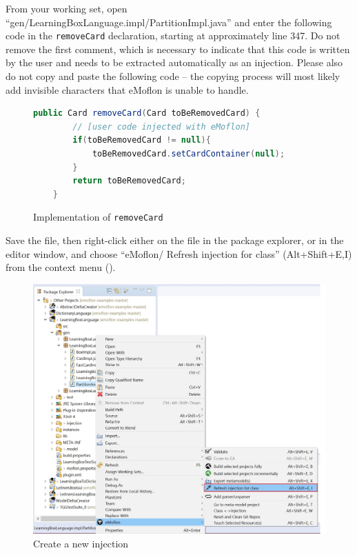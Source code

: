 \begin{stepbystep}

\item From your working set, open ``gen/LearningBoxLanguage.impl/Part\-it\-ionImpl.java'' and enter the following code in the
\texttt{removeCard} declaration, starting at approximately line 347. Do not remove the first comment, which is necessary to indicate that this code is written
by the user and needs to be extracted automatically as an injection. Please also do not copy and paste the following code -- the copying process will most
likely add invisible characters that eMoflon is unable to handle.

\vspace{0.5cm}

\begin{figure}[htbp]
        \centering
        \begin{lstlisting}[language=Java, keywordstyle={\bfseries\color{purple}}, backgroundcolor=\color{white}]
    public Card removeCard(Card toBeRemovedCard) {
		// [user code injected with eMoflon]
		if(toBeRemovedCard != null){
			toBeRemovedCard.setCardContainer(null);
		}
		return toBeRemovedCard;
	}
        \end{lstlisting}
        \caption{Implementation of \texttt{removeCard}}
        \label{code:addToStringRep_impl}
\end{figure}

\vspace{0.5cm}

\item Save the file, then right-click either on the file in the package explorer, or in the editor window, and choose ``eMoflon/
Refresh injection for class'' (Alt+Shift+E,I) from the context menu ().

\begin{figure}[htbp]
    \centering
    \includegraphics[width=\textwidth]{../../org.moflon.doc.handbook.02_leitnersLearningBox/5_introToInjections/iImages/eclipse_createInjection}
    \caption{Create a new injection}
    \label{eclipse:injection_create_injection}
\end{figure}


\end{stepbystep}
